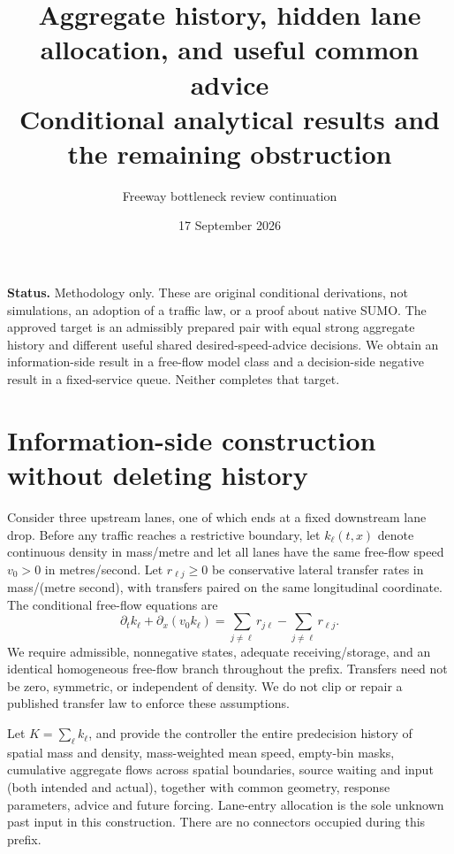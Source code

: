 \documentclass[11pt]{article}
\title{Aggregate history, hidden lane allocation, and useful common advice\\Conditional analytical results and the remaining obstruction}
\author{Freeway bottleneck review continuation}
\date{17 September 2026}
\begin{document}
\maketitle
\noindent\textbf{Status.} Methodology only. These are original conditional derivations,
not simulations, an adoption of a traffic law, or a proof about native SUMO.
The approved target is an admissibly prepared pair with equal strong aggregate
history and different useful shared desired-speed-advice decisions. We obtain
an information-side result in a free-flow model class and a decision-side
negative result in a fixed-service queue. Neither completes that target.

\section{Information-side construction without deleting history}
Consider three upstream lanes, one of which ends at a fixed downstream lane drop.
Before any traffic reaches a restrictive boundary, let $k_\ell(t,x)$ denote
continuous density in mass/metre and let all lanes have the same free-flow speed
$v_0>0$ in metres/second. Let $r_{\ell j}\geq0$ be conservative lateral transfer
rates in mass/(metre second), with transfers paired on the same longitudinal
coordinate. The conditional free-flow equations are
\begin{equation}
\partial_t k_\ell+\partial_x(v_0k_\ell)
=\sum_{j\ne\ell}r_{j\ell}-\sum_{j\ne\ell}r_{\ell j}.
\label{eq:lane}
\end{equation}
We require admissible, nonnegative states, adequate receiving/storage, and an
identical homogeneous free-flow branch throughout the prefix. Transfers need
not be zero, symmetric, or independent of density. We do not clip or repair a
published transfer law to enforce these assumptions.

Let $K=\sum_\ell k_\ell$, and provide the controller the entire predecision
history of spatial mass and density, mass-weighted mean speed, empty-bin masks,
cumulative aggregate flows across spatial boundaries, source waiting and input
(both intended and actual), together with common geometry, response parameters, advice and
future forcing. Lane-entry allocation is the sole unknown past input in this
construction. There are no connectors occupied during this prefix.
\end{document}
